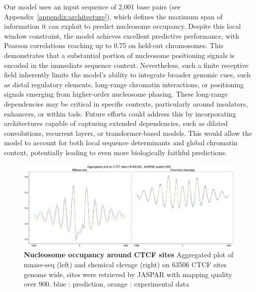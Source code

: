 \documentclass[11pt]{book}
\begin{document}
Our model uses an input sequence of 2,001 base pairs (see Appendix~\ref{appendix:architecture}), which defines the maximum span of information it can exploit to predict nucleosome occupancy. Despite this local window constraint, the model achieves excellent predictive performance, with Pearson correlations reaching up to 0.75 on held-out chromosomes. This demonstrates that a substantial portion of nucleosome positioning signals is encoded in the immediate sequence context.
Nevertheless, such a finite receptive field inherently limits the model’s ability to integrate broader genomic cues, such as distal regulatory elements, long-range chromatin interactions, or positioning signals emerging from higher-order nucleosome phasing. These long-range dependencies may be critical in specific contexts, particularly around insulators, enhancers, or within \glspl{tad}.
Future efforts could address this by incorporating architectures capable of capturing extended dependencies, such as dilated convolutions, recurrent layers, or transformer-based models. This would allow the model to account for both local sequence determinants and global chromatin context, potentially leading to even more biologically faithful predictions.

\begin{figure}[htbp]
    \includegraphics[width=\linewidth]{Figures/Results/ctcf_motif_aggregated.pdf}
    \caption{\textbf{ Nucleosome occupancy around CTCF sites} Aggregated plot of mnase-seq (left) and chemical clevage (right) on 63506 CTCF sites genome wide, sites were retrieved by JASPAR with mapping quality over 900. blue : prediction, orange : experimental data}
    \label{fig:ctcf_aggregate}
\end{figure}
\end{document}
